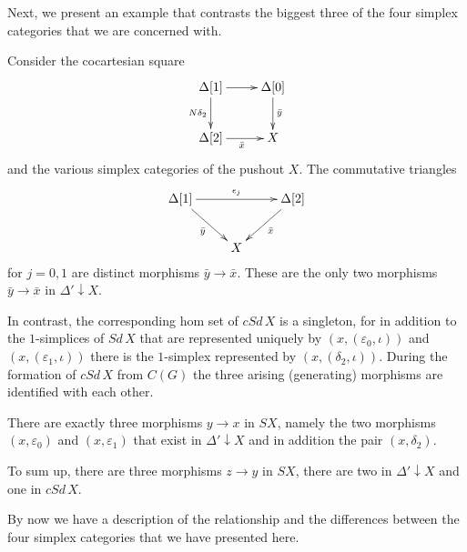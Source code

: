 Next, we present an example that contrasts the biggest three of the four simplex categories that we are concerned with.
\begin{example}\label{ex:simplex_cat}
Consider the cocartesian square
\begin{displaymath}
\xymatrix{
\Delta [1] \ar[d]_{N\delta _2} \ar[r] & \Delta [0] \ar[d]^{\bar{y} } \\
\Delta [2] \ar[r]_{\bar{x} } & X
}
\end{displaymath}
and the various simplex categories of the pushout $X$. The commutative triangles
\begin{displaymath}
\xymatrix{
\Delta [1] \ar[dr]_{\bar{y} } \ar[rr]^{\epsilon _j} && \Delta [2] \ar[ld]^{\bar{x} } \\
& X
}
\end{displaymath}
for $j=0,1$ are distinct morphisms $\bar{y} \to \bar{x}$. These are the only two morphisms $\bar{y} \to \bar{x}$ in $\Delta '\downarrow X$.

In contrast, the corresponding hom set of $cSd\, X$ is a singleton, for in addition to the $1$-simplices of $Sd\, X$ that are represented uniquely by $(x,(\varepsilon _0,\iota ))$ and $(x,(\varepsilon _1,\iota ))$ there is the $1$-simplex represented by $(x,(\delta _2,\iota ))$. During the formation of $cSd\, X$ from $C(G)$ the three arising (generating) morphisms are identified with each other.

There are exactly three morphisms $y\to x$ in $SX$, namely the two morphisms $(x,\varepsilon _0)$ and $(x,\varepsilon _1)$ that exist in $\Delta '\downarrow X$ and in addition the pair $(x,\delta _2)$.

To sum up, there are three morphisms $z\to y$ in $SX$, there are two in $\Delta '\downarrow X$ and one in $cSd\, X$.
\end{example}
\noindent By now we have a description of the relationship and the differences between the four simplex categories that we have presented here.

